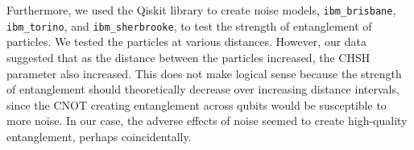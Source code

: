 \documentclass[a4paper, onecolumn, 11pt, titlepage]{quantumarticle}
\begin{document}
Furthermore, we used the Qiskit library to create noise models, \verb|ibm_brisbane|, \verb|ibm_torino|, and \verb|ibm_sherbrooke|, to test the strength of entanglement of particles. We tested the particles at various distances. However, our data suggested that as the distance between the particles increased, the CHSH parameter also increased. This does not make logical sense because the strength of entanglement should theoretically decrease over increasing distance intervals, since the CNOT creating entanglement across qubits would be susceptible to more noise. In our case, the adverse effects of noise seemed to create high-quality entanglement, perhaps coincidentally. 



\newpage


\newpage{}
\end{document}
